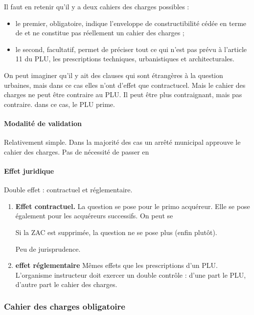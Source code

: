 		Il faut en retenir qu'il y a deux cahiers des charges possibles :
		\begin{itemize}
			\item le premier, obligatoire, indique l'enveloppe de constructibilité cédée en terme de \sdp et ne constitue pas réellement un cahier des charges ;
			\item le second, facultatif, permet de préciser tout ce qui n'est pas prévu à l'article 11 du PLU, les prescriptions techniques, urbanistiques et architecturales.
		\end{itemize}
	
	On peut imaginer qu'il y ait des clauses qui sont étrangères à la question urbaines, mais dans ce cas elles n'ont d'effet que contractucel. Mais le cahier des charges ne peut être contraire au PLU. Il peut être plus contraignant, mais pas contraire. dans ce cas, le PLU prime.
	
	\paragraph{Modalité de validation} Relativement simple. Dans la majorité des cas un arrêté municipal approuve le cahier des charges. Pas de nécessité de passer en \CM
	
	\paragraph{Effet juridique} Double effet : contractuel et réglementaire.
	
	\begin{enumerate}
		\item \textbf{Effet contractuel.} La question se pose pour le primo acquéreur. Elle se pose également pour les acquéreurs successifs. On peut se 
	
		Si la ZAC est supprimée, la question ne se pose plus (enfin plutôt).
		
		Peu de jurisprudence.
		
		\item \textbf{effet réglementaire} Mêmes effets que les prescriptions d'un PLU. L'organisme instructeur doit exercer un double contrôle : d'une part le PLU, d'autre part le cahier des charges.
	\end{enumerate}
	
	

		\subsubsection{Cahier des charges obligatoire}
		
